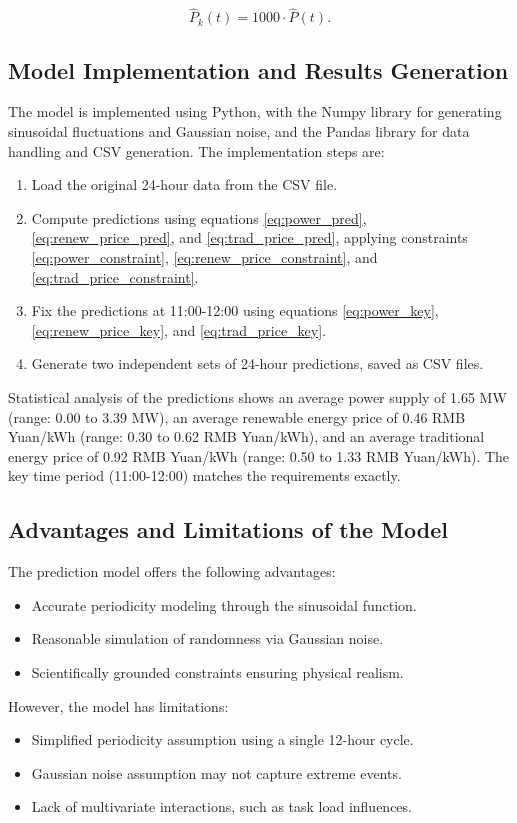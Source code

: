 \documentclass[a4paper,12pt]{article}
\begin{document}
\begin{equation}
\hat{P}_k(t) = 1000 \cdot \hat{P}(t). \label{eq:power_kwh}
\end{equation}

\subsection{Model Implementation and Results Generation}

The model is implemented using Python, with the Numpy library for generating sinusoidal fluctuations and Gaussian noise, and the Pandas library for data handling and CSV generation. The implementation steps are:

\begin{enumerate}
    \item Load the original 24-hour data from the CSV file.
    \item Compute predictions using equations \eqref{eq:power_pred}, \eqref{eq:renew_price_pred}, and \eqref{eq:trad_price_pred}, applying constraints \eqref{eq:power_constraint}, \eqref{eq:renew_price_constraint}, and \eqref{eq:trad_price_constraint}.
    \item Fix the predictions at 11:00-12:00 using equations \eqref{eq:power_key}, \eqref{eq:renew_price_key}, and \eqref{eq:trad_price_key}.
    \item Generate two independent sets of 24-hour predictions, saved as CSV files.
\end{enumerate}

Statistical analysis of the predictions shows an average power supply of 1.65 MW (range: 0.00 to 3.39 MW), an average renewable energy price of 0.46 RMB Yuan/kWh (range: 0.30 to 0.62 RMB Yuan/kWh), and an average traditional energy price of 0.92 RMB Yuan/kWh (range: 0.50 to 1.33 RMB Yuan/kWh). The key time period (11:00-12:00) matches the requirements exactly.

\subsection{Advantages and Limitations of the Model}

The prediction model offers the following advantages:

\begin{itemize}
    \item Accurate periodicity modeling through the sinusoidal function.
    \item Reasonable simulation of randomness via Gaussian noise.
    \item Scientifically grounded constraints ensuring physical realism.
\end{itemize}

However, the model has limitations:

\begin{itemize}
    \item Simplified periodicity assumption using a single 12-hour cycle.
    \item Gaussian noise assumption may not capture extreme events.
    \item Lack of multivariate interactions, such as task load influences.
\end{itemize}
\end{document}
